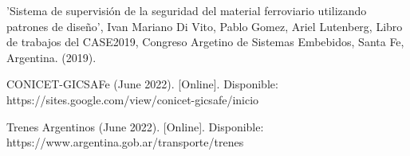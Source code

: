 \documentclass[
11pt, %
spanish,
singlespacing, %
parskip, %
headsepline, %
]{MastersDoctoralThesis} %
\begin{document}
\begin{thebibliography}{00}

 'Sistema de supervisión de la seguridad del material
ferroviario utilizando patrones de diseño', Ivan Mariano Di Vito, Pablo Gomez, Ariel Lutenberg, Libro de trabajos del CASE2019, Congreso Argetino de Sistemas Embebidos, Santa Fe, Argentina. (2019).

 CONICET-GICSAFe (June 2022). [Online]. Disponible: \\ https://sites.google.com/view/conicet-gicsafe/inicio

 Trenes Argentinos (June 2022). [Online]. Disponible: \\ https://www.argentina.gob.ar/transporte/trenes 

\end{thebibliography}

\end{document}
